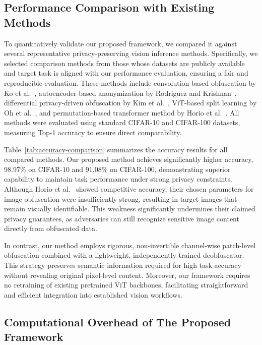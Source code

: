 \documentclass{ieeeaccess}
\begin{document}
\subsection{Performance Comparison with Existing Methods}\label{sec:comparison}



To quantitatively validate our proposed framework, we compared it against several representative privacy-preserving vision inference methods. Specifically, we selected comparison methods from those whose datasets are publicly available and target task is aligned with our performance evaluation, ensuring a fair and reproducible evaluation. These methods include convolution-based obfuscation by Ko et al.~\cite{9129656}, autoencoder-based anonymization by Rodriguez and Krishnan~\cite{10.1007/978-3-031-37586-6_18}, differential privacy-driven obfuscation by Kim et al.~\cite{s24103166}, ViT-based split learning by Oh et al.~\cite{oh2022differentially}, and permutation-based transformer method by Horio et al.~\cite{horio2024privacypreservingvisiontransformerusing}. All methods were evaluated using standard CIFAR-10 and CIFAR-100 datasets, measuring Top-1 accuracy to ensure direct comparability.

Table~\ref{tab:accuracy-comparison} summarizes the accuracy results for all compared methods. Our proposed method achieves significantly higher accuracy, 98.97\% on CIFAR-10 and 91.08\% on CIFAR-100, demonstrating superior capability to maintain task performance under strong privacy constraints. Although Horio et al.~\cite{horio2024privacypreservingvisiontransformerusing} showed competitive accuracy, their chosen parameters for image obfuscation were insufficiently strong, resulting in target images that remain visually identifiable. This weakness significantly undermines their claimed privacy guarantees, as adversaries can still recognize sensitive image content directly from obfuscated data.

In contrast, our method employs rigorous, non-invertible channel-wise patch-level obfuscation combined with a lightweight, independently trained deobfuscator. This strategy preserves semantic information required for high task accuracy without revealing original pixel-level content. Moreover, our framework requires no retraining of existing pretrained ViT backbones, facilitating straightforward and efficient integration into established vision workflows.


\subsection{Computational Overhead of The Proposed Framework}
\end{document}
